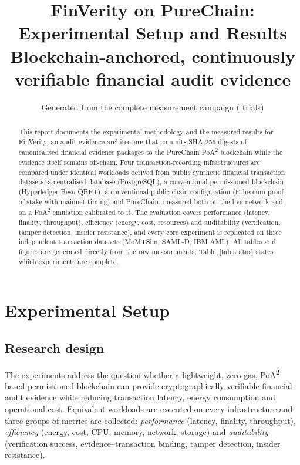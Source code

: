 \documentclass[10pt]{article}
\title{FinVerity on PureChain: Experimental Setup and Results\\[2pt]
\large Blockchain-anchored, continuously verifiable financial audit evidence}
\author{}
\date{Generated from the complete measurement campaign (\Trials{} trials)}
\newcommand{\poa}{PoA\textsuperscript{2}}
\begin{document}
\maketitle

\begin{abstract}
\noindent This report documents the experimental methodology and the measured results for FinVerity, an audit-evidence
architecture that commits SHA-256 digests of canonicalised financial evidence packages to the PureChain
\poa{} blockchain while the evidence itself remains off-chain. Four transaction-recording infrastructures are
compared under identical workloads derived from public synthetic financial transaction datasets: a centralised
database (PostgreSQL), a conventional permissioned blockchain (Hyperledger Besu QBFT), a conventional public-chain
configuration (Ethereum proof-of-stake with mainnet timing) and PureChain, measured both on the live network and on a
\poa{} emulation calibrated to it. The evaluation covers performance (latency, finality, throughput), efficiency
(energy, cost, resources) and auditability (verification, tamper detection, insider resistance), and every core
experiment is replicated on three independent transaction datasets (MoMTSim, SAML-D, IBM AML). All tables and
figures are generated directly from the raw measurements; Table~\ref{tab:status} states which experiments are
complete.
\end{abstract}

\section{Experimental Setup}\label{sec:setup}

\subsection{Research design}
The experiments address the question whether a lightweight, zero-gas, \poa-based permissioned blockchain can provide
cryptographically verifiable financial audit evidence while reducing transaction latency, energy consumption and
operational cost. Equivalent workloads are executed on every infrastructure and three groups of metrics are
collected: \emph{performance} (latency, finality, throughput), \emph{efficiency} (energy, cost, CPU, memory, network,
storage) and \emph{auditability} (verification success, evidence--transaction binding, tamper detection, insider
resistance).
\end{document}
